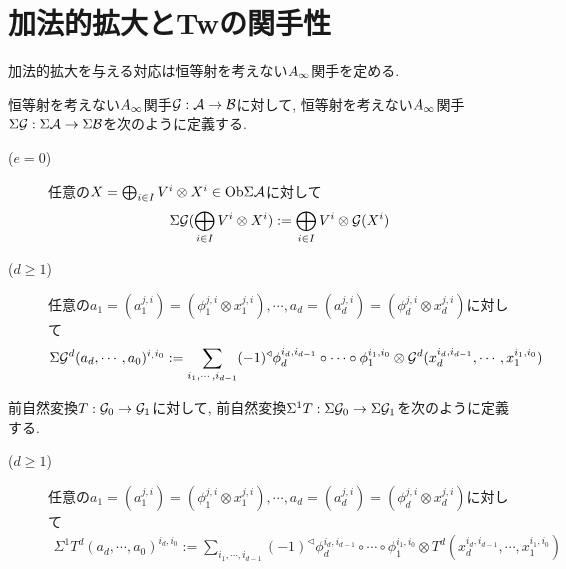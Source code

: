\documentclass[uplatex, a4paper, 14Q, dvipdfmx]{jsarticle}
\begin{document}
\section{加法的拡大とTwの関手性}

加法的拡大を与える対応は恒等射を考えない$A_{\infty}$関手を定める.

\begin{definition}
  恒等射を考えない$A_{\infty}$関手$\mathcal{G} : \mathcal{A} \to \mathcal{B}$に対して, 恒等射を考えない$A_{\infty}$関手$\Sigma\mathcal{G} : \Sigma\mathcal{A} \to \Sigma\mathcal{B}$を次のように定義する. 
  \begin{description}
    \item[($e=0$)] 任意の$X = \bigoplus_{i \in I} V^i \otimes X^i \in \mathrm{Ob}\Sigma\mathcal{A}$に対して
    \begin{align*}
      \Sigma\mathcal{G} (\bigoplus_{i \in I} V^i \otimes X^i) 
      := \bigoplus_{i \in I} V^i \otimes \mathcal{G}(X^i)
    \end{align*}
    \item[($d \geq 1$)] 任意の$a_1 = (a_1^{j,i}) = (\phi_1^{j,i} \otimes x_1^{j,i}), \cdots, a_d = (a_d^{j,i}) = (\phi_d^{j,i} \otimes x_d^{j,i})$に対して
    \begin{align*}
      \Sigma\mathcal{G}^d (a_d,\cdots,a_0)^{i_,i_0}
      := \sum_{i_1,\cdots,i_{d-1}} (-1)^\triangleleft \phi_d^{i_d,i_{d-1}} \circ  \cdots \circ \phi_1^{i_1,i_0} \otimes \mathcal{G}^d(x_d^{i_d,i_{d-1}}, \cdots, x_1^{i_1,i_0})
    \end{align*}
  \end{description}
\end{definition}

\begin{definition}
  前自然変換$T : \mathcal{G}_0 \to \mathcal{G}_1$に対して, 前自然変換$\Sigma^1T : \Sigma\mathcal{G}_0 \to \Sigma\mathcal{G}_1$を次のように定義する.
  \begin{description}
    \item[($d \geq 1$)] 任意の$a_1 = (a_1^{j,i}) = (\phi_1^{j,i} \otimes x_1^{j,i}), \cdots, a_d = (a_d^{j,i}) = (\phi_d^{j,i} \otimes x_d^{j,i})$に対して
    \begin{align*}
      \Sigma^1T^d (a_d,\cdots,a_0)^{i_d,i_0} 
      := \sum_{i_1,\cdots,i_{d-1}} (-1)^\triangleleft \phi_d^{i_d,i_{d-1}} \circ  \cdots \circ \phi_1^{i_1,i_0} \otimes T^d(x_d^{i_d,i_{d-1}}, \cdots, x_1^{i_1,i_0})
    \end{align*}
  \end{description}
\end{definition}
\end{document}
